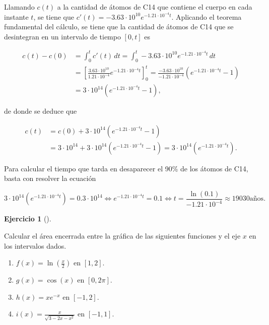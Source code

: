 \documentclass[
  a4paper,
]{scrreport}
\theoremstyle{definition}
\newtheorem{exercise}{Ejercicio}[chapter]
\theoremstyle{remark}
\begin{document}
\begin{tcolorbox}[enhanced jigsaw, coltitle=black, toptitle=1mm, colframe=quarto-callout-tip-color-frame, colbacktitle=quarto-callout-tip-color!10!white, breakable, opacityback=0, bottomtitle=1mm, opacitybacktitle=0.6, title=\textcolor{quarto-callout-tip-color}{\faLightbulb}\hspace{0.5em}{Solución}, arc=.35mm, leftrule=.75mm, toprule=.15mm, titlerule=0mm, bottomrule=.15mm, left=2mm, rightrule=.15mm, colback=white]

Llamando \(c(t)\) a la cantidad de átomos de C14 que contiene el cuerpo
en cada instante \(t\), se tiene que
\(c'(t) = -3.63\cdot 10^{10}e^{-1.21\cdot 10^{-4}t}\). Aplicando el
teorema fundamental del cálculo, se tiene que la cantidad de átomos de
C14 que se desintegran en un intervalo de tiempo \([0,t]\) es

\begin{align*}
c(t) - c(0) 
&= \int_0^t c'(t)\,dt
= \int_0^t -3.63\cdot 10^{10}e^{-1.21\cdot 10^{-4}t}\,dt \\
&= [\frac{3.63\cdot 10^{10}}{1.21\cdot 10^{-4}}e^{-1.21\cdot 10^{-4}t}]_0^t
= \frac{-3.63\cdot 10^{10}}{-1.21\cdot 10^{-4}}(e^{-1.21\cdot 10^{-4}t}-1) \\
&= 3\cdot 10^{14}(e^{-1.21\cdot 10^{-4}t}-1),
\end{align*}

de donde se deduce que

\begin{align*}
c(t) 
&= c(0) + 3\cdot 10^{14}(e^{-1.21\cdot 10^{-4}t}-1) \\
&= 3\cdot 10^{14} + 3\cdot 10^{14}(e^{-1.21\cdot 10^{-4}t}-1)
= 3\cdot 10^{14}(e^{-1.21\cdot 10^{-4}t}).
\end{align*}

Para calcular el tiempo que tarda en desaparecer el 90\% de los átomos
de C14, basta con resolver la ecuación

\[
3\cdot 10^{14}(e^{-1.21\cdot 10^{-4}t}) = 0.3\cdot 10^{14}
\Leftrightarrow e^{-1.21\cdot 10^{-4}t} = 0.1
\Leftrightarrow t = \frac{\ln(0.1)}{-1.21\cdot 10^{-4}} \approx 19030 \mbox{años.}
\]

\end{tcolorbox}

\begin{exercise}[]\protect\hypertarget{exr-areas-1}{}\label{exr-areas-1}

Calcular el área encerrada entre la gráfica de las siguientes funciones
y el eje \(x\) en los intervalos dados.

\begin{enumerate}
\def\labelenumi{\alph{enumi}.}
\item
  \(f(x) = \ln\left(\frac{x}{2}\right)\) en \([1,2]\).
\item
  \(g(x) = \cos(x)\) en \([0,2\pi]\).
\item
  \(h(x) = xe^{-x}\) en \([-1,2]\).
\item
  \(i(x) = \frac{x}{\sqrt{3-2x-x^2}}\) en \([-1,1]\).
\end{enumerate}

\end{exercise}
\end{document}
